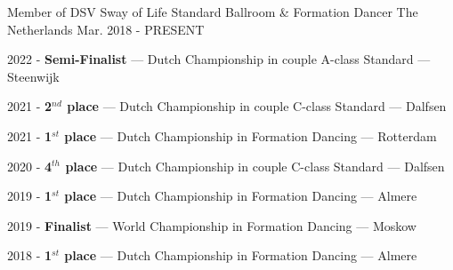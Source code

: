 
\begin{cventries}




	\cventry
	{Member of DSV Sway of Life} %
	{Standard Ballroom \& Formation Dancer} %
	{The Netherlands} %
	{Mar. 2018 - PRESENT} %
	{
		\begin{cvitems} %
			\item {2022 - \textbf{Semi-Finalist} --- Dutch Championship in couple A-class Standard --- Steenwijk}
			\item {2021 - \textbf{2$^{nd}$ place} --- Dutch Championship in couple C-class Standard --- Dalfsen}
			\item {2021 - \textbf{1$^{st}$ place} --- Dutch Championship in Formation Dancing --- Rotterdam}
			\item {2020 - \textbf{4$^{th}$ place} --- Dutch Championship in couple C-class Standard --- Dalfsen}
			\item {2019 - \textbf{1$^{st}$ place} --- Dutch Championship in Formation Dancing --- Almere}
			\item {2019 - \textbf{Finalist} --- World Championship in Formation Dancing --- Moskow}
			\item {2018 - \textbf{1$^{st}$ place} --- Dutch Championship in Formation Dancing --- Almere}
		\end{cvitems}
	}


\end{cventries}

